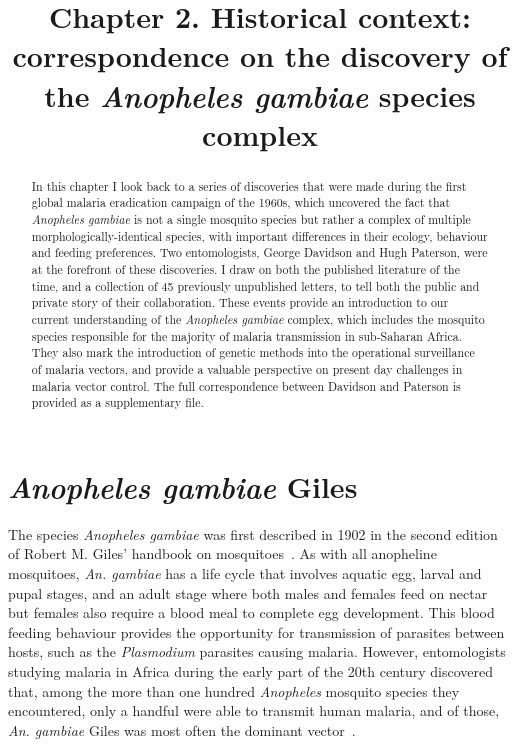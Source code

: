 \documentclass[a4paper,11pt,abstracton,hidelinks]{scrartcl}
\title{
Chapter 2. Historical context: correspondence on the discovery of the \textit{Anopheles gambiae} species complex
}
\author{}
\begin{document}
\renewcommand{\abstractname}{Summary}


\maketitle


\begin{abstract}


In this chapter I look back to a series of discoveries that were made during the first global malaria eradication campaign of the 1960s, which uncovered the fact that \textit{Anopheles gambiae} is not a single mosquito species but rather a complex of multiple morphologically-identical species, with important differences in their ecology, behaviour and feeding preferences. 
%
Two entomologists, George Davidson and Hugh Paterson, were at the forefront of these discoveries.
%
I draw on both the published literature of the time, and a collection of 45 previously unpublished letters, to tell both the public and private story of their collaboration.
%
These events provide an introduction to our current understanding of the \textit{Anopheles gambiae} complex, which includes the mosquito species responsible for the majority of malaria transmission in sub-Saharan Africa.
%
They also mark the introduction of genetic methods into the operational surveillance of malaria vectors, and provide a valuable perspective on present day challenges in malaria vector control.
%
The full correspondence between Davidson and Paterson is provided as a supplementary file.


\end{abstract}


\tableofcontents


\section{\textit{Anopheles gambiae} Giles}\label{sec:anopheles-gambiae-giles}

The species \textit{Anopheles gambiae} was first described in 1902 in the second edition of Robert M. Giles' handbook on mosquitoes~\parencite{Giles1902}.
%
As with all anopheline mosquitoes, \textit{An. gambiae} has a life cycle that involves aquatic egg, larval and pupal stages, and an adult stage where both males and females feed on nectar but females also require a blood meal to complete egg development.
%
This blood feeding behaviour provides the opportunity for transmission of parasites between hosts, such as the \textit{Plasmodium} parasites causing malaria.
%
However, entomologists studying malaria in Africa during the early part of the 20th century discovered that, among the more than one hundred \textit{Anopheles} mosquito species they encountered, only a handful were able to transmit human malaria, and of those, \textit{An. gambiae} Giles was most often the dominant vector~\parencite{DeMeillon1947,DeMeillon1950,Gillies1968}.
\end{document}
